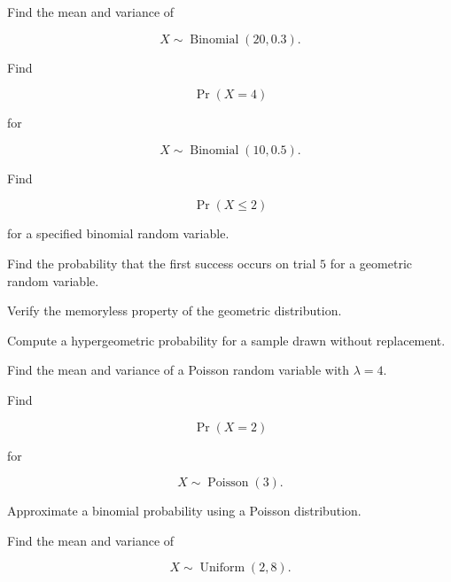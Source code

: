\begin{exercise}[1]
Find the mean and variance of

\[
X\sim\operatorname{Binomial}(20,0.3).
\]
\end{exercise}

\begin{exercise}[2]
Find

\[
\Pr(X=4)
\]

for

\[
X\sim\operatorname{Binomial}(10,0.5).
\]
\end{exercise}

\begin{exercise}[2]
Find

\[
\Pr(X\leq2)
\]

for a specified binomial random variable.
\end{exercise}

\begin{exercise}[2]
Find the probability that the first success occurs on trial \(5\) for a
geometric random variable.
\end{exercise}

\begin{exercise}[2]
Verify the memoryless property of the geometric distribution.
\end{exercise}

\begin{exercise}[2]
Compute a hypergeometric probability for a sample drawn without replacement.
\end{exercise}

\begin{exercise}[2]
Find the mean and variance of a Poisson random variable with
\(\lambda=4\).
\end{exercise}

\begin{exercise}[2]
Find

\[
\Pr(X=2)
\]

for

\[
X\sim\operatorname{Poisson}(3).
\]
\end{exercise}

\begin{exercise}[2]
Approximate a binomial probability using a Poisson distribution.
\end{exercise}

\begin{exercise}[2]
Find the mean and variance of

\[
X\sim\operatorname{Uniform}(2,8).
\]
\end{exercise}

